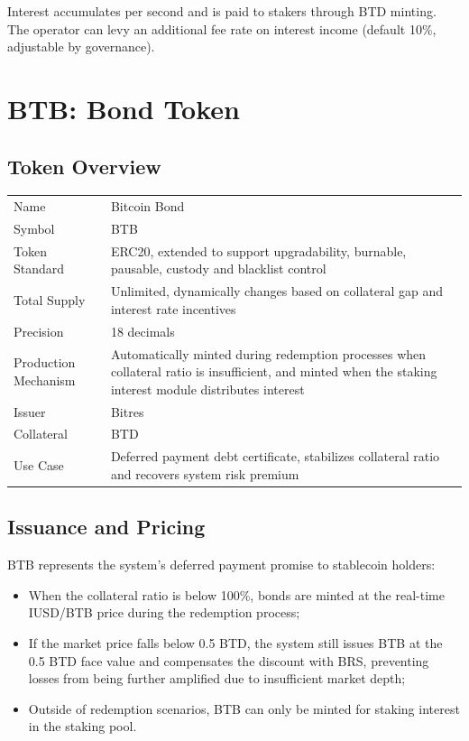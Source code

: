 \documentclass{article}
\begin{document}
Interest accumulates per second and is paid to stakers through BTD minting. The operator can levy an additional fee rate on interest income (default 10\%, adjustable by governance).

\section{BTB: Bond Token}
\subsection{Token Overview}
\begin{tabularx}{\textwidth}{l X}
\toprule
Name & Bitcoin Bond \\
Symbol & BTB \\
Token Standard & ERC20, extended to support upgradability, burnable, pausable, custody and blacklist control \\
Total Supply & Unlimited, dynamically changes based on collateral gap and interest rate incentives \\
Precision & 18 decimals \\
Production Mechanism & Automatically minted during redemption processes when collateral ratio is insufficient, and minted when the staking interest module distributes interest \\
Issuer & Bitres \\
Collateral & BTD \\
Use Case & Deferred payment debt certificate, stabilizes collateral ratio and recovers system risk premium \\
\bottomrule
\end{tabularx}

\subsection{Issuance and Pricing}
BTB represents the system's deferred payment promise to stablecoin holders:
\begin{itemize}
  \item When the collateral ratio is below 100\%, bonds are minted at the real-time IUSD/BTB price during the redemption process;
  \item If the market price falls below 0.5 BTD, the system still issues BTB at the 0.5 BTD face value and compensates the discount with BRS, preventing losses from being further amplified due to insufficient market depth;
  \item Outside of redemption scenarios, BTB can only be minted for staking interest in the staking pool.
\end{itemize}
\end{document}
